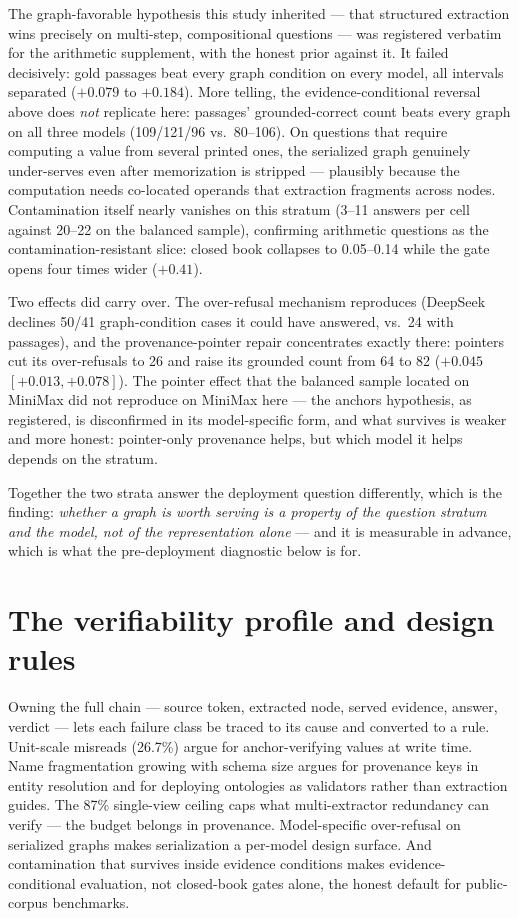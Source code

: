 \documentclass{article}
\begin{document}
The graph-favorable hypothesis this study inherited --- that structured
extraction wins precisely on multi-step, compositional questions --- was
registered verbatim for the arithmetic supplement, with the honest prior
against it. It failed decisively: gold passages beat every graph condition
on every model, all intervals separated ($+0.079$ to $+0.184$). More
telling, the evidence-conditional reversal above does \emph{not}
replicate here: passages' grounded-correct count beats every graph on all
three models (109/121/96 vs.\ 80--106). On questions that require computing
a value from several printed ones, the serialized graph genuinely
under-serves even after memorization is stripped --- plausibly because the
computation needs co-located operands that extraction fragments across
nodes. Contamination itself nearly vanishes on this stratum (3--11 answers
per cell against 20--22 on the balanced sample), confirming arithmetic
questions as the contamination-resistant slice: closed book collapses to
0.05--0.14 while the gate opens four times wider ($+0.41$).

Two effects did carry over. The over-refusal mechanism reproduces
(DeepSeek declines 50/41 graph-condition cases it could have answered,
vs.\ 24 with passages), and the provenance-pointer repair concentrates
exactly there: pointers cut its over-refusals to 26 and raise its grounded
count from 64 to 82 ($+0.045$ $[+0.013, +0.078]$). The pointer effect that
the balanced sample located on MiniMax did not reproduce on MiniMax here --- the anchors
hypothesis, as registered, is disconfirmed in its model-specific form, and
what survives is weaker and more honest: pointer-only provenance helps,
but which model it helps depends on the stratum.

Together the two strata answer the deployment question differently, which
is the finding: \emph{whether a graph is worth serving is a property of the
question stratum and the model, not of the representation alone} --- and it
is measurable in advance, which is what the pre-deployment
diagnostic below is for.

\section{The verifiability profile and design rules}\label{app:profile}

Owning the full chain --- source token, extracted node, served evidence,
answer, verdict --- lets each failure class be traced to its cause and
converted to a rule. Unit-scale misreads (26.7\%) argue for anchor-verifying
values at write time. Name fragmentation growing with schema size argues for
provenance keys in entity resolution and for deploying ontologies as
validators rather than extraction guides. The 87\% single-view ceiling caps
what multi-extractor redundancy can verify --- the budget belongs in
provenance. Model-specific over-refusal on serialized graphs makes
serialization a per-model design surface. And contamination that survives
inside evidence conditions makes evidence-conditional evaluation, not
closed-book gates alone, the honest default for public-corpus benchmarks.
\end{document}

